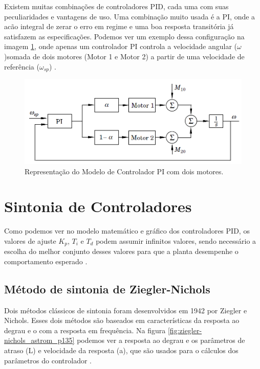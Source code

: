 Existem muitas combinações de controladores PID, cada uma com suas peculiaridades e vantagens de uso. Uma combinação muito usada é a PI, onde a acão integral de zerar o erro em regime e uma boa resposta transitória já satisfazem as especificações. Podemos ver um exemplo dessa configuração na imagem \ref{fig:pi_twomotors_astrom_p308}, onde apenas um controlador PI controla a velocidade angular (\textit{$\omega$})somada de dois motores (Motor 1 e Motor 2) a partir de uma velocidade de referência (\textit{$\omega_{sp}$}) \cite{Astrom1995}.

\begin{figure}[!ht]
  \caption{Representação do Modelo de Controlador PI com dois motores.}
  \begin{center}
      \includegraphics[scale=0.65]{img/pi_twomotors_astrom_p308}
  \end{center}
  \label{fig:pi_twomotors_astrom_p308}
\end{figure}

\section{Sintonia de Controladores}

Como podemos ver no modelo matemático e gráfico dos controladores PID, os valores de ajuste $K_p$, $T_i$ e $T_d$  podem assumir infinitos valores, sendo necessário a escolha do melhor conjunto desses valores para que a planta desempenhe o comportamento esperado \cite{Ogata}.


\subsection{Método de sintonia de Ziegler-Nichols}

Dois métodos clássicos de sintonia foram desenvolvidos em 1942 por Ziegler e Nichols. Esses dois métodos são baseados em características da resposta ao degrau e o com a resposta em frequência. Na figura \ref{fig:ziegler-nichols_astrom_p135} podemos ver a resposta ao degrau e os parâmetros de atraso (L) e velocidade da resposta (a), que são usados para o cálculos dos parâmetros do controlador  \cite{Astrom1995}. 

